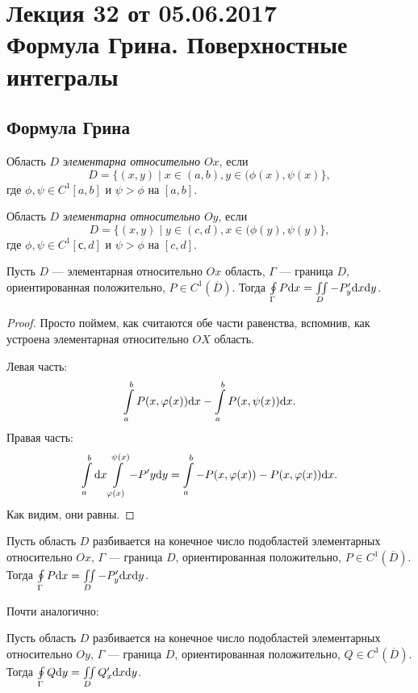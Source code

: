 \section{Лекция 32 от 05.06.2017 \\ Формула Грина. Поверхностные интегралы}
\subsection{Формула Грина}
\begin{Def}
Область $D$ \textit{элементарна относительно $Ox$}, если 
$$D = \{ (x, y) \mid x \in (a, b), y \in (\phi(x), \psi(x) \},$$
где $\phi, \psi \in C^{1}[a, b]$ и $\psi > \phi$ на $[a, b]$.
\end{Def}
\begin{Def}
Область $D$ \textit{элементарна относительно $Oy$}, если 
$$D = \{ (x, y) \mid y \in (c, d), x \in (\phi(y), \psi(y) \},$$
где $\phi, \psi \in C^{1}[с, d]$ и $\psi > \phi$ на $[c, d]$.
\end{Def}

\begin{Lemma}
Пусть $D$ --- элементарная относительно $Ox$ область, $\Gamma$ --- граница $D$, ориентированная положительно, $P \in C^1(\overline{D})$. Тогда $\oint\limits_\Gamma P\mathrm{d}x = \iint\limits_D - P'_y\mathrm{d}x \mathrm{d} y$.
\end{Lemma}
\begin{proof}
Просто поймем, как считаются обе части равенства, вспомнив, как устроена элементарная относительно $OX$ область.

Левая часть:
$$
\int\limits_a^b P(x,\varphi(x))\mathrm{d}x - \int\limits_a^bP(x, \psi(x))\mathrm{d}x.
$$
Правая часть:
$$
\int\limits_a^b\mathrm{d}x\int\limits_{\varphi(x)}^{\psi(x)} -P'y\mathrm{d} y = \int\limits_a^b-P(x, \varphi(x)) - P(x, \varphi(x))\mathrm{d}x.
$$
Как видим, они равны.
\end{proof}

\begin{Consequence}
Пусть область $D$ разбивается на конечное число подобластей элементарных относительно  $Ox$, $\Gamma$ --- граница $D$, ориентированная положительно, $P \in C^1(\overline{D})$. Тогда $\oint\limits_\Gamma P\mathrm{d}x = \iint\limits_D - P'_y\mathrm{d}x \mathrm{d} y$.
\end{Consequence}

Почти аналогично:
\begin{Consequence}
Пусть область $D$ разбивается на конечное число подобластей элементарных относительно  $Oy$, $\Gamma$ --- граница $D$, ориентированная положительно, $Q \in C^1(\overline{D})$. Тогда $\oint\limits_\Gamma Q\mathrm{d} y = \iint\limits_D Q'_x\mathrm{d}x \mathrm{d} y$.
\end{Consequence}

